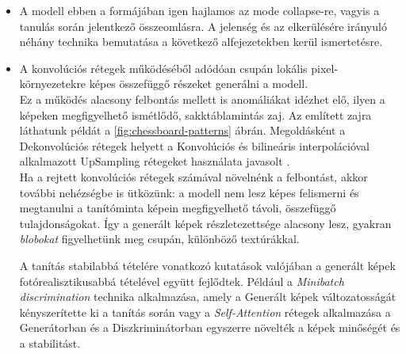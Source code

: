 \begin{itemize}
	\item A modell ebben a formájában igen hajlamos az mode collapse-re, vagyis a tanulás során jelentkező összeomlásra. A jelenség és az elkerülésére irányuló néhány technika bemutatása a következő alfejezetekben kerül ismertetésre.
	\item A konvolúciós rétegek működéséből adódóan csupán lokális pixel-környezetekre képes összefüggő részeket generálni a modell.\\
	Ez a működés alacsony felbontás mellett is anomáliákat idézhet elő, ilyen a képeken megfigyelhető ismétlődő, sakktáblamintás zaj. Az említett zajra láthatunk példát a \ref{fig:chessboard-patterns} ábrán. Megoldásként a Dekonvolúciós rétegek helyett a Konvolúciós és bilineáris interpolációval alkalmazott UpSampling rétegeket használata javasolt \cite{odena2016deconvolution}.\\
	Ha a rejtett konvolúciós rétegek számával növelnénk a felbontást, akkor további nehézségbe is ütközünk: a modell nem lesz képes felismerni és megtanulni a tanítóminta képein megfigyelhető távoli, összefüggő tulajdonságokat. Így a generált képek részletezettsége alacsony lesz, gyakran \textit{blobokat} figyelhetünk meg csupán, különböző textúrákkal. \cite{salimans2016improved}

	A tanítás stabilabbá tételére vonatkozó kutatások valójában a generált képek fotórealisztikusabbá tételével együtt fejlődtek. Például a \textit{Minibatch discrimination} \cite{salimans2016improved} technika alkalmazása, amely a Generált képek változatosságát kényszerítette ki a tanítás során vagy a \textit{Self-Attention} \cite{zhang2019self} rétegek alkalmazása a Generátorban és a Diszkriminátorban egyszerre növelték a képek minőségét és a stabilitást.
	

\end{itemize}

